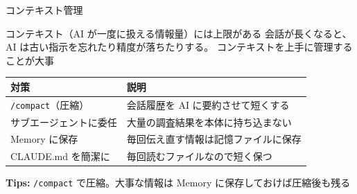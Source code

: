 \documentclass[aspectratio=169, 14pt]{beamer}
\newcommand{\api}[1]{\texttt{\color{sfblue}#1}}
\begin{document}
\begin{frame}{コンテキスト管理}
  \begin{alertblock}{コンテキスト（AI が一度に扱える情報量）には上限がある}
    {\small 会話が長くなると、AI は古い指示を忘れたり精度が落ちたりする。
    コンテキストを上手に管理することが大事}
  \end{alertblock}

  \begin{table}
    \centering\footnotesize
    \begin{tabular}{lp{70mm}}
      \hline
      \textbf{対策} & \textbf{説明} \\
      \hline
      \api{/compact}（圧縮）    & 会話履歴を AI に要約させて短くする \\
      サブエージェントに委任     & 大量の調査結果を本体に持ち込まない \\
      Memory に保存              & 毎回伝え直す情報は記憶ファイルに保存 \\
      CLAUDE.md を簡潔に         & 毎回読むファイルなので短く保つ \\
      \hline
    \end{tabular}
  \end{table}

  {\scriptsize \textbf{Tips:}
    \api{/compact} で圧縮。大事な情報は Memory に保存しておけば圧縮後も残る}
\end{frame}

\end{document}
